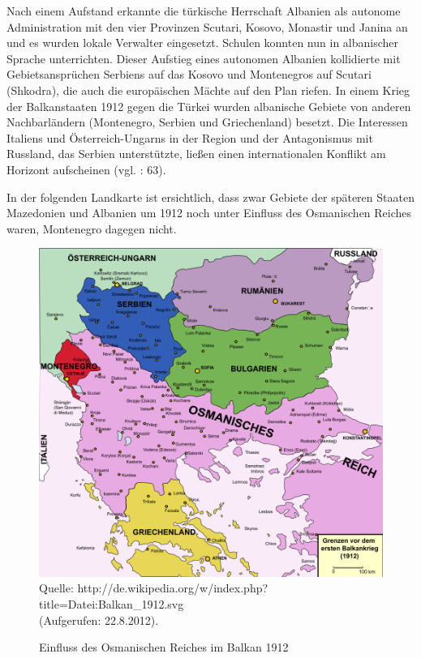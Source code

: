 Nach einem Aufstand erkannte die türkische Herrschaft Albanien als autonome Administration mit den vier Provinzen Scutari, Kosovo, Monastir und Janina an und es wurden lokale Verwalter eingesetzt. Schulen konnten nun in albanischer Sprache unterrichten. Dieser Aufstieg eines autonomen Albanien kollidierte mit Gebietsansprüchen Serbiens auf das Kosovo und Montenegros auf Scutari (Shkodra), die auch die europäischen Mächte auf den Plan riefen. In einem Krieg der Balkanstaaten 1912 gegen die Türkei wurden albanische Gebiete von anderen Nachbarländern (Montenegro, Serbien und Griechenland) besetzt. Die Interessen Italiens und Österreich-Ungarns in der Region und der Antagonismus mit Russland, das Serbien unterstützte, ließen einen internationalen Konflikt am Horizont aufscheinen (vgl. \cite{chek} : 63).\par
 In der folgenden Landkarte ist ersichtlich, dass zwar Gebiete der späteren Staaten Mazedonien
und Albanien um 1912 noch unter Einfluss des Osmanischen Reiches waren,
Montenegro dagegen nicht.
\begin{figure}[H]
  \centering
\setlength\belowcaptionskip{10pt}
  \caption{Einfluss des Osmanischen Reiches im Balkan 1912}
  \includegraphics[width=5in]{Material/Balkan_1912}\\
\vspace{10pt}
Quelle: http://de.wikipedia.org/w/index.php?title=Datei:Balkan\_1912.svg\\ (Aufgerufen: 22.8.2012).
\end{figure}


